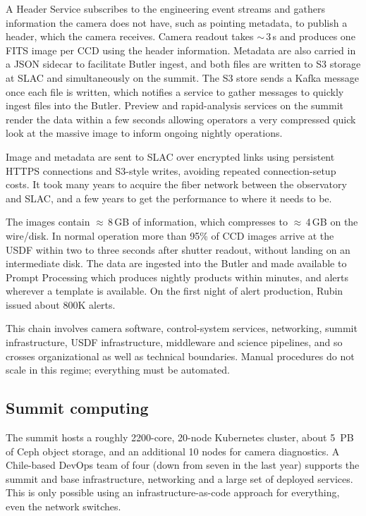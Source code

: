 A Header Service subscribes to the engineering event streams and gathers information the camera does not have, such as pointing metadata, to publish a header, which the camera receives.
Camera readout takes $\sim$\,3\,s and produces one FITS image per CCD using the header information.
Metadata are also carried in a JSON sidecar to facilitate Butler \citep{2022SPIE12189E..11J} ingest, and both files are written to S3 storage at SLAC and simultaneously on the summit. The S3 store sends a Kafka message once each file is written, which notifies a service to gather messages to quickly ingest files into the Butler.
Preview and rapid-analysis services on the summit render the data within a few seconds allowing operators a very compressed quick look at the massive image to inform ongoing nightly operations.

Image and metadata are sent to SLAC over encrypted links using persistent HTTPS connections and S3-style writes, avoiding repeated connection-setup costs.
It took many years to acquire the fiber network between the observatory and SLAC, and a few years to get the performance to where it needs to be.

The images contain $\approx$\,8\,GB of information, which compresses to $\approx$\,4\,GB on the wire/disk.
In normal operation more than 95\% of CCD images arrive at the USDF within two to three seconds after shutter readout, without landing on an intermediate disk.
The data are ingested into the Butler and made available to Prompt Processing which produces nightly products within minutes, and alerts wherever a template is available.
On the first night of alert production, Rubin issued about 800K alerts.

This chain involves camera software, control-system services, networking, summit infrastructure, USDF infrastructure, middleware and science pipelines, and so crosses organizational as well as technical boundaries.
Manual procedures do not scale in this regime; everything must be automated.

\subsection{Summit computing}
\label{sec:summit}

The summit hosts a roughly 2200-core, 20-node Kubernetes cluster, about 5~PB of Ceph object storage, and an additional 10 nodes for camera diagnostics.
A Chile-based DevOps team of four (down from seven in the last year) supports the summit and base infrastructure, networking and a large set of deployed services.
This is only possible using an infrastructure-as-code approach for everything, even the network switches.

